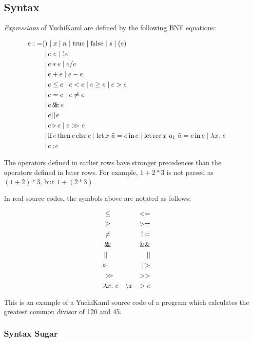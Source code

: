 
\subsection{Syntax}

\emph{Expressions} of YuchiKaml are defined by the following BNF equations:

\begin{align*}
    e \defeq    & () \mid x \mid n \mid \trueToken \mid \falseToken \mid s \mid (e)\\
                &\mid e\ e \mid \logNot e\\
                &\mid e * e \mid e / e\\
                &\mid e + e \mid e - e\\
                &\mid e \leq e \mid e < e \mid e \geq e \mid e > e\\
                &\mid e = e \mid e \not= e\\
                &\mid e \logAnd e\\
                &\mid e \logOr e\\
                &\mid e \triangleright e \mid e \composition e\\
                &\mid \ifToken e \thenToken e \elseToken e \mid \letToken x\ \tilde{a} = e \inToken e \mid \letToken \recToken x\ a_1\ \tilde{a} = e \inToken e\mid \abs{x}{e}\\
                &\mid e\opCol{}e
\end{align*}

The operators defined in earlier rows have stronger precedences than the operators defined in later rows.
For example, $1 + 2 * 3$ is not parsed as $(1 + 2) * 3$, but $1 + ( 2 * 3)$.

In real source codes, the symbols above are notated as follows:

\begin{align*}
    &\leq & <=\\
    &\geq & >=\\
    &\not= & !=\\
    &\logAnd & \&\&\\
    &\logOr & ||\\
    &\triangleright & |>\\
    &\composition & >>\\
    &\abs{x}{e} & \backslash x -> e
\end{align*}


\begin{example}[GCD]
    This is an example of a YuchiKaml source code of a program which calculates the greatest common divisor of 120 and 45.

    
\end{example}

\subsubsection{Syntax Sugar}

